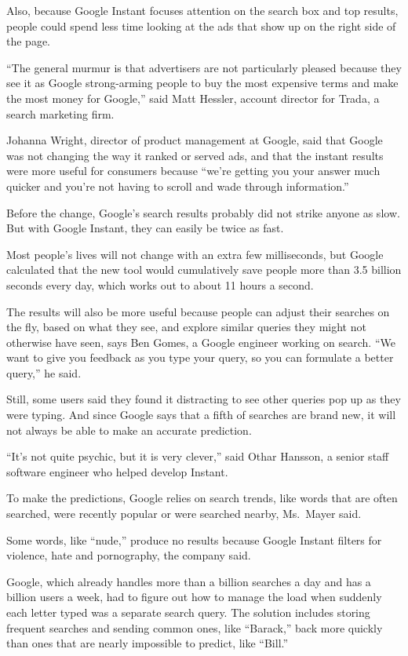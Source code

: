 ﻿\documentclass[12pt]{article}
\begin{document}
Also, because Google Instant focuses attention on the search box and top results, people could spend
less time looking at the ads that show up on the right side of the page.

``The general murmur is that advertisers are not particularly pleased because they see it as Google
strong-arming people to buy the most expensive terms and make the most money for Google,'' said Matt
Hessler, account director for Trada, a search marketing firm.

Johanna Wright, director of product management at Google, said that Google was not changing the way
it ranked or served ads, and that the instant results were more useful for consumers because ``we're
getting you your answer much quicker and you're not having to scroll and wade through information.''

Before the change, Google's search results probably did not strike anyone as slow. But with Google
Instant, they can easily be twice as fast.

Most people's lives will not change with an extra few milliseconds, but Google calculated that the
new tool would cumulatively save people more than 3.5 billion seconds every day, which works out to
about 11 hours a second.

The results will also be more useful because people can adjust their searches on the fly, based on
what they see, and explore similar queries they might not otherwise have seen, says Ben Gomes, a
Google engineer working on search. ``We want to give you feedback as you type your query, so you can
formulate a better query,'' he said.

Still, some users said they found it distracting to see other queries pop up as they were typing.
And since Google says that a fifth of searches are brand new, it will not always be able to make an
accurate prediction.

``It's not quite psychic, but it is very clever,'' said Othar Hansson, a senior staff software
engineer who helped develop Instant.

To make the predictions, Google relies on search trends, like words that are often searched, were
recently popular or were searched nearby, Ms.~Mayer said.

Some words, like ``nude,'' produce no results because Google Instant filters for violence, hate and
pornography, the company said.

Google, which already handles more than a billion searches a day and has a billion users a week, had
to figure out how to manage the load when suddenly each letter typed was a separate search query.
The solution includes storing frequent searches and sending common ones, like ``Barack,'' back more
quickly than ones that are nearly impossible to predict, like ``Bill.''
\end{document}
